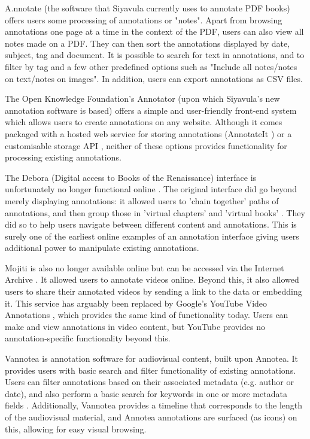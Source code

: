 A.nnotate \citep{AnnotateCom} (the software that Siyavula currently uses to annotate PDF books) offers users some processing of annotations or "notes". Apart from browsing annotations one page at a time in the context of the PDF, users can also view all notes made on a PDF. They can then sort the annotations displayed by date, subject, tag and document. It is possible to search for text in annotations, and to filter by tag and a few other predefined options such as "Include all notes/notes on text/notes on images". In addition, users can export annotations as CSV files.

The Open Knowledge Foundation's Annotator (upon which Siyavula's new annotation software is based) \citep{Annotator} offers a simple and user-friendly front-end system which allows users to create annotations on any website. Although it comes packaged with a hosted web service for storing annotations (AnnotateIt \citep{AnnotateIt}) or a customisable storage API \citep{AnnotatorAPI}, neither of these options provides functionality for processing existing annotations.

The Debora (Digital access to Books of the Renaissance) interface \citep{debora} is unfortunately no longer functional online \citep{DeboraLink}. The original interface did go beyond merely displaying annotations: it allowed users to 'chain together' paths of annotations, and then group those in 'virtual chapters' and 'virtual books' \citep[p. 6]{debora}. They did so to help users navigate between different content and annotations. This is surely one of the earliest online examples of an annotation interface giving users additional power to manipulate existing annotations. 

Mojiti \citep{Mojiti} is also no longer available online but can be accessed via the Internet Archive \citep{InternetArchive}. It allowed users to annotate videos online. Beyond this, it also allowed users to share their annotated videos by sending a link to the data or embedding it. This service has arguably been replaced by Google's YouTube Video Annotations \citep{YouTubeAnns}, which provides the same kind of functionality today. Users can make and view annotations in video content, but YouTube provides no annotation-specific functionality beyond this. 

Vannotea \citep{Vannotea} is annotation software for audiovisual content, built upon Annotea. It provides users with basic search and filter functionality of existing annotations. Users can filter annotations based on their associated metadata (e.g. author or date), and also perform a basic search for keywords in one or more metadata fields \citep{AnnoteaSidebarDoc}. Additionally, Vannotea provides a timeline that corresponds to the length of the audiovisual material, and Annotea annotations are surfaced (as icons) on this, allowing for easy visual browsing. 

